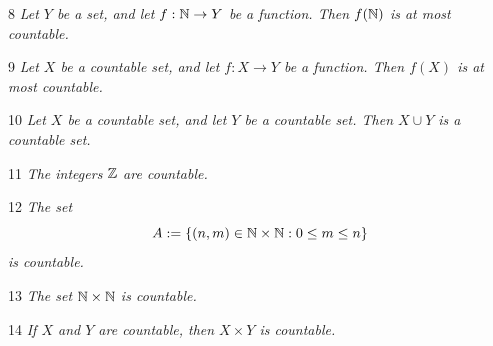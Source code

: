 \begin{proposition}{8}
    \label{image-of-nat-countable}
    \emph{Let $Y$ be a set, and let $f: \mathbb{N} \to Y$ be a function. Then
    $f(\mathbb{N})$ is at most countable.}
\end{proposition}

\begin{corollary}{9}
    \label{image-of-countable}
    \emph{Let $X$ be a countable set, and let $f: X \rightarrow Y$ be a function.
    Then $f(X)$ is at most countable.}
\end{corollary}

\begin{proposition}{10}
    \label{countable-union}
    \emph{Let $X$ be a countable set, and let $Y$ be a countable set. Then $X \cup Y$
    is a countable set.}
\end{proposition}

\begin{corollary}{11}
    \label{integers-countable}
    \emph{The integers $\mathbb{Z}$ are countable.}
\end{corollary}

\begin{lemma}{12}
    \label{lower-diagonal-countable}
    \emph{The set
    \begin{equation*}
        A := \{(n, m) \in \mathbb{N} \times \mathbb{N} : 0 \leq m \leq n\}
    \end{equation*}
    is countable.}
\end{lemma}

\begin{corollary}{13}
    \label{nat-times-nat-countable}
    \emph{The set $\mathbb{N} \times \mathbb{N}$ is countable.}
\end{corollary}

\begin{corollary}{14}
    \label{countable-product}
    \emph{If $X$ and $Y$ are countable, then $X \times Y$ is countable.}
\end{corollary}

